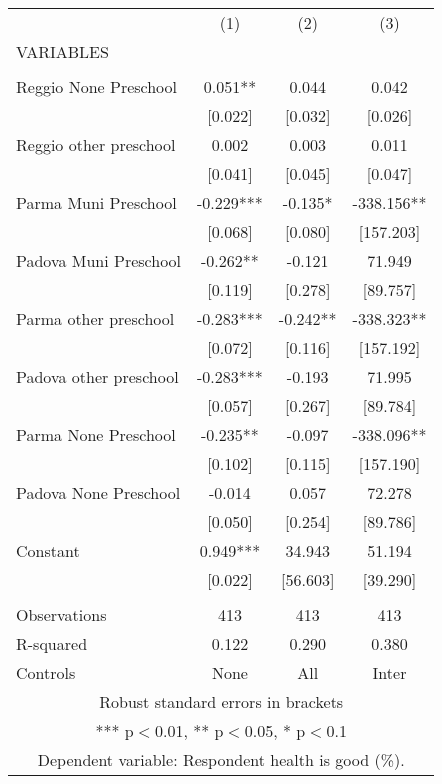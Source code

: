 \begin{tabular}{lccc} \hline
 & (1) & (2) & (3) \\
VARIABLES &  &  &  \\ \hline
 &  &  &  \\
Reggio None Preschool & 0.051** & 0.044 & 0.042 \\
 & [0.022] & [0.032] & [0.026] \\
Reggio other preschool & 0.002 & 0.003 & 0.011 \\
 & [0.041] & [0.045] & [0.047] \\
Parma Muni Preschool & -0.229*** & -0.135* & -338.156** \\
 & [0.068] & [0.080] & [157.203] \\
Padova Muni Preschool & -0.262** & -0.121 & 71.949 \\
 & [0.119] & [0.278] & [89.757] \\
Parma other preschool & -0.283*** & -0.242** & -338.323** \\
 & [0.072] & [0.116] & [157.192] \\
Padova other preschool & -0.283*** & -0.193 & 71.995 \\
 & [0.057] & [0.267] & [89.784] \\
Parma None Preschool & -0.235** & -0.097 & -338.096** \\
 & [0.102] & [0.115] & [157.190] \\
Padova None Preschool & -0.014 & 0.057 & 72.278 \\
 & [0.050] & [0.254] & [89.786] \\
Constant & 0.949*** & 34.943 & 51.194 \\
 & [0.022] & [56.603] & [39.290] \\
 &  &  &  \\
Observations & 413 & 413 & 413 \\
R-squared & 0.122 & 0.290 & 0.380 \\
 Controls & None & All & Inter \\ \hline
\multicolumn{4}{c}{ Robust standard errors in brackets} \\
\multicolumn{4}{c}{ *** p$<$0.01, ** p$<$0.05, * p$<$0.1} \\
\multicolumn{4}{c}{ Dependent variable: Respondent health is good (\%).} \\
\end{tabular}
